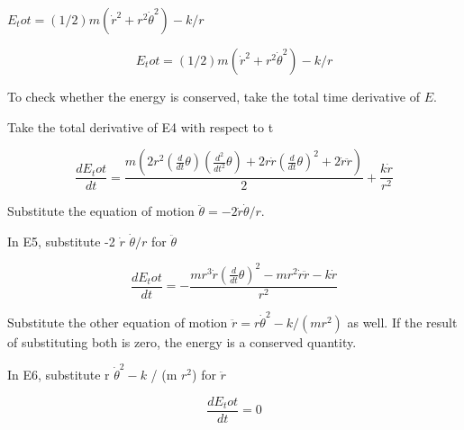 \documentclass[dvipdfmx]{article}
\begin{document}
$E_tot = (1/2) m (\dot{r}^2 + r^2 \dot{\theta}^2) - k / r$

\begin{equation}
  E_tot = (1/2) m (\dot{r}^2 + r^2 \dot{\theta}^2) - k / r
  \label{eq:E4}
\end{equation}

To check whether the energy is conserved, take the total time derivative of $E$.

Take the total derivative of E4 with respect to t

\begin{equation}
  \frac{dE_tot}{dt} = \frac{m \left(2 r^2 \left(\frac{d}{d t} \theta\right) \left(\frac{d^2}{d t^2} \theta\right)+2 r \dot{r} \left(\frac{d}{d t} \theta\right)^2+2 \dot{r} \ddot{r}\right)}{2}+\frac{k \dot{r}}{r^2}
  \label{eq:E5}
\end{equation}

Substitute the equation of motion $\ddot\theta=-2\dot r\dot\theta/r$.

In E5, substitute -2 $\dot{r}$ $\dot{\theta} / r$ for $\ddot{\theta}$

\begin{equation}
  \frac{dE_tot}{dt} = -\frac{m r^3 \dot{r} \left(\frac{d}{d t} \theta\right)^2-m r^2 \dot{r} \ddot{r}-k \dot{r}}{r^2}
  \label{eq:E6}
\end{equation}

Substitute the other equation of motion $\ddot r=r\dot\theta^2-k/(mr^2)$ as well. If the result of substituting both is zero, the energy is a conserved quantity.

In E6, substitute r $\dot{\theta}^2 - k$ / (m $r^2$) for $\ddot{r}$

\begin{equation}
  \frac{dE_tot}{dt} = 0
  \label{eq:E7}
\end{equation}
\end{document}
